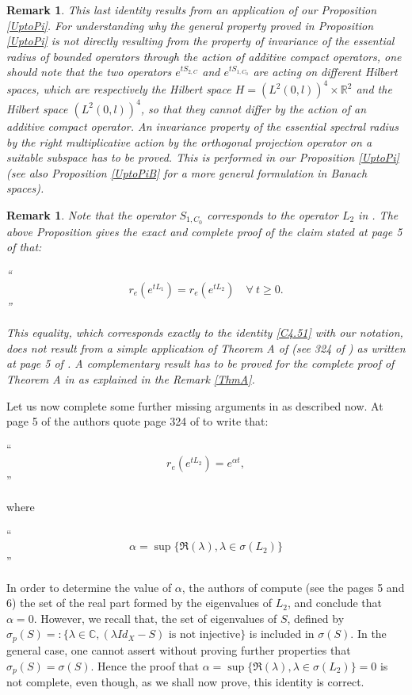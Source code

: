 \documentclass[10pt, english]{article}
\newtheorem{oss}[thm]{Remark}
\begin{document}
{\begin{oss}
This last identity results from an application of our Proposition \ref{UptoPi}. For understanding why the general property proved in Proposition \ref{UptoPi} is not directly resulting from the property of invariance of the essential radius of bounded operators through the action of additive compact operators, one should note that the two operators $e^{tS_{2,C}}$ and $e^{tS_{1,C_0}}$ are acting on different Hilbert spaces, which are respectively the Hilbert space $H=(L^2(0,l))^4 \times \mathbb{R}^2$ and the Hilbert space $(L^2(0,l))^4$, so that they cannot differ by the action of an additive compact operator. An invariance property of the essential spectral radius by the right multiplicative action by the orthogonal projection operator on a suitable subspace has to be proved. This is performed in our Proposition \ref{UptoPi} (see also Proposition \ref{UptoPiB} for a more general formulation in Banach spaces). 
\end{oss}

\begin{oss}\label{L1L2}
Note that the operator $S_{1,C_0}$ corresponds to the operator $L_2$ in \cite{SW2003}. The above Proposition gives the exact and complete proof of the claim stated at page 5 of \cite{SW2003} that:

\enquote{
$$
r_e(e^{tL_1})=r_e(e^{tL_2}) \quad \forall \ t \geqslant 0.
$$
}

This equality, which corresponds exactly to the identity \eqref{C4.51} with our notation, does not result from a simple application of Theorem A of \cite{NRL1986} (see 324 of \cite{NRL1986}) as written at page 5 of \cite{SW2003}. A complementary result has to be proved for the complete proof of Theorem A in \cite{NRL1986} as explained in the Remark \ref{ThmA}.
\end{oss}

Let us now complete some further missing arguments in \cite{SW2003} as described now.
At page 5 of \cite{SW2003} the authors quote page 324 of \cite{NRL1986} to write that:

\enquote{
$$
r_e(e^{tL_2})=e^{\alpha t},
$$
}

where

\enquote{ 
$$
\alpha=\sup\{\Re(\lambda), \lambda \in \sigma(L_2)\}
$$
}

In order to determine the value of $\alpha$, the authors of \cite{SW2003} compute (see the pages 5 and 6) the set of the real part formed by the eigenvalues of $L_2$, and conclude that
$\alpha=0$. However, we recall that, the set of eigenvalues of $S$, defined by $\sigma_p(S)=:\{\lambda \in \mathbb{C},(\lambda Id_X -S) \mbox{ is not injective} \}$ is included in $\sigma(S)$. In the general case, one cannot assert without proving further properties that $\sigma_p(S)=\sigma(S)$. Hence the proof that $\alpha=\sup\{\Re(\lambda), \lambda \in \sigma(L_2)\}=0$
is not complete, even though, as we shall now prove, this identity is correct.

}
\end{document}
